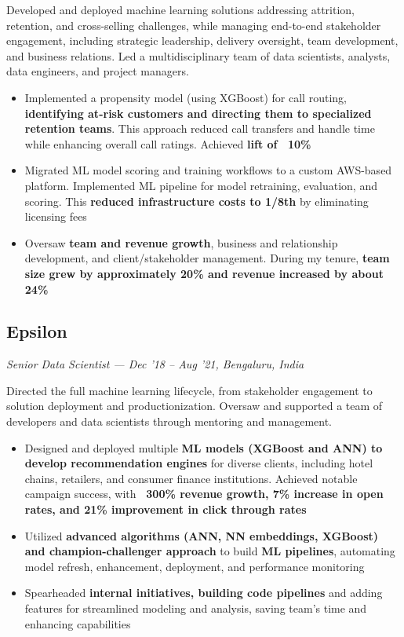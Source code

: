 \documentclass[letterpaper,10pt]{article}
\begin{document}
  Developed and deployed machine learning solutions addressing attrition, retention, and cross-selling challenges, while managing end-to-end stakeholder engagement, including strategic leadership, delivery oversight, team development, and business relations. Led a multidisciplinary team of data scientists, analysts, data engineers, and project managers.
  \begin{itemize}[leftmargin=1em]
    \item Implemented a propensity model (using XGBoost) for call routing, \textbf{identifying at-risk customers and directing them to specialized retention teams}. This approach reduced call transfers and handle time while enhancing overall call ratings. Achieved \textbf{lift of ~10\%}
    \item Migrated ML model scoring and training workflows to a custom AWS-based platform. Implemented ML pipeline for model retraining, evaluation, and scoring. This \textbf{reduced infrastructure costs to 1/8th} by eliminating licensing fees
    \item Oversaw \textbf{team and revenue growth}, business and relationship development, and client/stakeholder management. During my tenure, \textbf{team size grew by approximately 20\% and revenue increased by about 24\%}
  \end{itemize}

  \subsection*{Epsilon}
  \textit{Senior Data Scientist — Dec '18 -- Aug '21, Bengaluru, India}
  \textit{\newline}

  Directed the full machine learning lifecycle, from stakeholder engagement to solution deployment and productionization. Oversaw and supported a team of developers and data scientists through mentoring and management.
  \begin{itemize}[leftmargin=1em]
    \item Designed and deployed multiple \textbf{ML models (XGBoost and ANN) to develop recommendation engines} for diverse clients, including hotel chains, retailers, and consumer finance institutions. Achieved notable campaign success, with \textbf{~300\% revenue growth, 7\% increase in open rates, and 21\% improvement in click through rates}
    \item Utilized \textbf{advanced algorithms (ANN, NN embeddings, XGBoost) and champion-challenger approach} to build \textbf{ML pipelines}, automating model refresh, enhancement, deployment, and performance monitoring
    \item Spearheaded \textbf{internal initiatives, building code pipelines} and adding features for streamlined modeling and analysis, saving team's time and enhancing capabilities
  \end{itemize}
\end{document}
